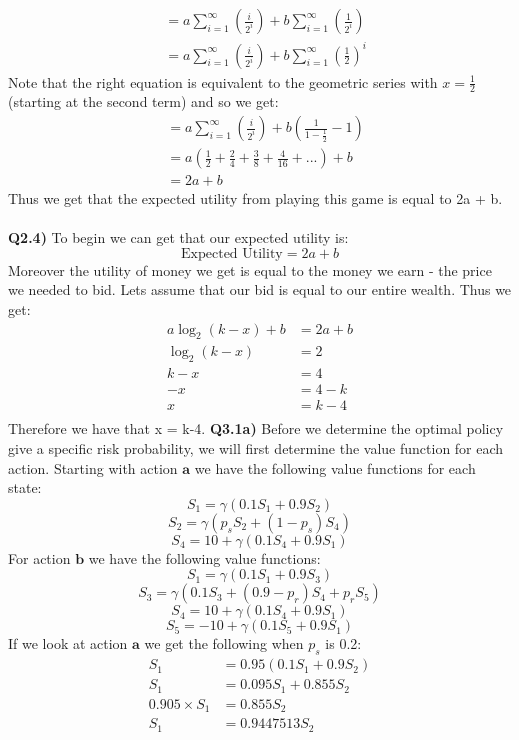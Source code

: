 \documentclass{article}
\begin{document}
\begin{titlepage}
\begin{align*}
&= a\sum^\infty_{i=1}(\frac{i}{2^i}) + b\sum^\infty_{i=1}(\frac{1}{2^i})\\
&= a\sum^\infty_{i=1}(\frac{i}{2^i}) + b\sum^\infty_{i=1}(\frac{1}{2})^i
\end{align*}
Note that the right equation is equivalent to the geometric series with $x = \frac{1}{2}$ (starting at the second term) and so we get:
\begin{align*}
&= a\sum^\infty_{i=1}(\frac{i}{2^i}) + b (\frac{1}{1-\frac{1}{2}}-1) \\
&= a \left(\frac{1}{2} + \frac{2}{4} + \frac{3}{8} + \frac{4}{16} + ... \right) + b \\
&= 2a + b
\end{align*}
Thus we get that the expected utility from playing this game is equal to 2a + b.\\\\
\textbf{Q2.4)} To begin we can get that our expected utility is:
\[ \text{Expected Utility} = 2a + b \]
Moreover the utility of money we get is equal to the money we earn - the price we needed to bid. Lets assume that our bid is equal to our entire wealth. Thus we get:
\begin{align*}
 a\log_2(k-x)+b &= 2a + b\\
 \log_2(k-x) &= 2\\
 k-x &= 4\\
 -x &= 4-k\\
 x &= k-4\\
\end{align*}
Therefore we have that x = k-4.
\newpage
\textbf{Q3.1a)} Before we determine the optimal policy give a specific risk probability, we will first determine the value function for each action. Starting with action $\textbf{a}$ we have the following value functions for each state:
\[ S_1 = \gamma(0.1S_1 +0.9S_2) \]
\[ S_2 = \gamma(p_sS_2 + (1-p_s)S_4) \]
\[ S_4 = 10 + \gamma(0.1S_4 + 0.9S_1) \]
For action $\textbf{b}$ we have the following value functions:
\[ S_1 = \gamma(0.1S_1 +0.9S_3) \]
\[ S_3 = \gamma(0.1S_3 + (0.9-p_r)S_4 + p_rS_5) \]
\[ S_4 = 10 + \gamma(0.1S_4 + 0.9S_1) \]
\[ S_5 = -10 + \gamma(0.1S_5 + 0.9S_1) \]
If we look at action $\textbf{a}$ we get the following when $p_s$ is 0.2:
\begin{align*}
S_1 &= 0.95(0.1S_1 +0.9S_2) \\
S_1 &= 0.095S_1 + 0.855S_2 \\
0.905\times S_1 &= 0.855S_2 \\
S_1 &= 0.9447513S_2 \\\\

\end{align*}
\end{titlepage}
\end{document}

